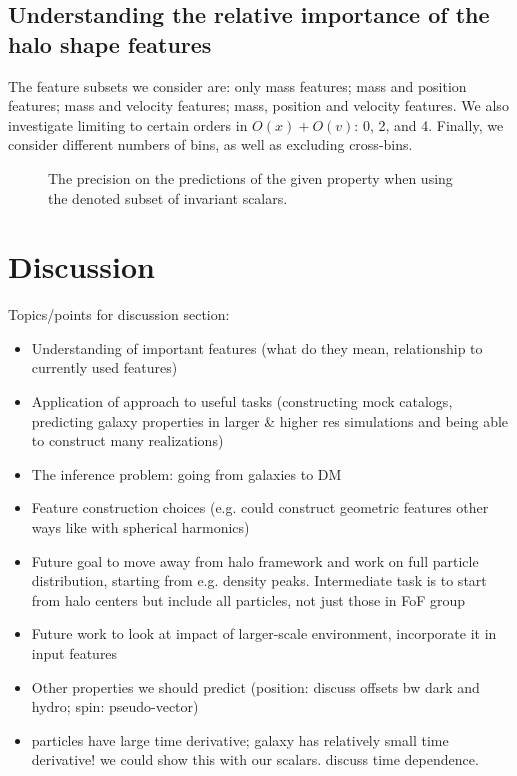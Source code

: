 \subsection{Understanding the relative importance of the halo shape features}

The feature subsets we consider are: only mass features; mass and position features; mass and velocity features; mass, position and velocity features.
We also investigate limiting to certain orders in $O(x)+O(v)$: 0, 2, and 4.
Finally, we consider different numbers of bins, as well as excluding cross-bins.

\begin{figure}
    \centering
    \caption{The precision on the predictions of the given property when using the denoted subset of invariant scalars.}
    \label{fig:features}
\end{figure}


\section{Discussion}
\label{sec:discussion}

Topics/points for discussion section:
\begin{itemize}
    \item Understanding of important features (what do they mean, relationship to currently used features)
    \item Application of approach to useful tasks (constructing mock catalogs, predicting galaxy properties in larger \& higher res simulations and being able to construct many realizations)
    \item The inference problem: going from galaxies to DM
    \item Feature construction choices (e.g. could construct geometric features other ways like with spherical harmonics)
    \item Future goal to move away from halo framework and work on full particle distribution, starting from e.g. density peaks. Intermediate task is to start from halo centers but include all particles, not just those in FoF group
    \item Future work to look at impact of larger-scale environment, incorporate it in input features
    \item Other properties we should predict (position: discuss offsets bw dark and hydro; spin: pseudo-vector)
    \item particles have large time derivative; galaxy has relatively small time derivative! we could show this with our scalars. discuss time dependence.
\end{itemize}


